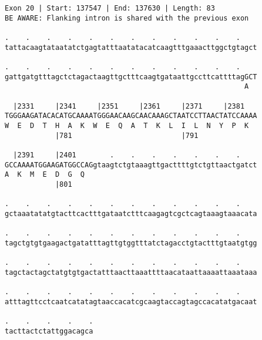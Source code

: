 \documentclass{article}
\begin{document}
\begin{Verbatim}[fontfamily=courier]
Exon 20 | Start: 137547 | End: 137630 | Length: 83
BE AWARE: Flanking intron is shared with the previous exon

.    .    .    .    .    .    .    .    .    .    .    .    
tattacaagtataatatctgagtatttaatatacatcaagtttgaaacttggctgtagct

.    .    .    .    .    .    .    .    .    .    .    .    
gattgatgtttagctctagactaagttgctttcaagtgataattgccttcattttagGCT
                                                         A  

  |2331     |2341     |2351     |2361     |2371     |2381   
TGGGAAGATACACATGCAAAATGGGAACAAGCAACAAAGCTAATCCTTAACTATCCAAAA
W  E  D  T  H  A  K  W  E  Q  A  T  K  L  I  L  N  Y  P  K  
            |781                          |791              

  |2391     |2401        .    .    .    .    .    .    .    
GCCAAAATGGAAGATGGCCAGgtaagtctgtaaagttgacttttgtctgttaactgatct
A  K  M  E  D  G  Q                                         
            |801                                            

.    .    .    .    .    .    .    .    .    .    .    .    
gctaaatatatgtacttcactttgataatctttcaagagtcgctcagtaaagtaaacata

.    .    .    .    .    .    .    .    .    .    .    .    
tagctgtgtgaagactgatatttagttgtggtttatctagacctgtactttgtaatgtgg

.    .    .    .    .    .    .    .    .    .    .    .    
tagctactagctatgtgtgactatttaacttaaattttaacataattaaaattaaataaa

.    .    .    .    .    .    .    .    .    .    .    .    
atttagttcctcaatcatatagtaaccacatcgcaagtaccagtagccacatatgacaat

.    .    .    .    .
tacttactctattggacagca
\end{Verbatim}
\newpage
\end{document}
